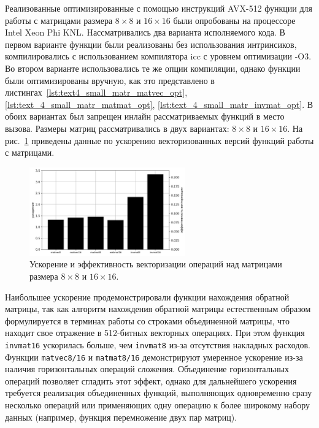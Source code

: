 Реализованные оптимизированные с помощью инструкций AVX-512 функции для работы с матрицами размера $8 \times 8$ и $16 \times 16$ были опробованы на процессоре Intel Xeon Phi KNL\label{abbr:knl-6}.
Hассматривались два варианта исполняемого кода.
В первом варианте функции были реализованы без использования интринсиков, компилировались с использованием компилятора icc с уровнем оптимизации -O3.
Во втором варианте использовались те же опции компиляции, однако функции были оптимизированы вручную, как это представлено в листингах~\ref{lst:text4_small_matr_matvec_opt}, \ref{lst:text_4_small_matr_matmat_opt}, \ref{lst:text_4_small_matr_invmat_opt}.
В обоих вариантах был запрещен инлайн рассматриваемых функций в место вызова.
Размеры матриц рассматривались в двух вариантах: $8 \times 8$ и $16 \times 16$.
На рис.~\ref{fig:text_4_small_matr_res} приведены данные по ускорению векторизованных версий функций работы с матрицами.

\begin{figure}[ht]
\centering
\includegraphics[width=0.6\textwidth]{./fig/vec_small_matr_res.png}
\singlespacing
{}\caption{Ускорение и эффективность векторизации операций над матрицами размера $8 \times 8$ и $16 \times 16$.}
\label{fig:text_4_small_matr_res}
\end{figure}

Наибольшее ускорение продемонстрировали функции нахождения обратной матрицы, так как алгоритм нахождения обратной матрицы естественным образом формулируется в терминах работы со строками объединенной матрицы, что находит свое отражение в 512-битных векторных операциях.
При этом функция \texttt{invmat16} ускорилась больше, чем \texttt{invmat8} из-за отсутствия накладных расходов.
Функции \texttt{matvec8/16} и \texttt{matmat8/16} демонстрируют умеренное ускорение из-за наличия горизонтальных операций сложения.
Объединение горизонтальных операций позволяет сгладить этот эффект, однако для дальнейшего ускорения требуется реализация объединенных функций, выполняющих одновременно сразу несколько операций или применяющих одну операцию к более широкому набору данных (например, функция перемножение двух пар матриц).

